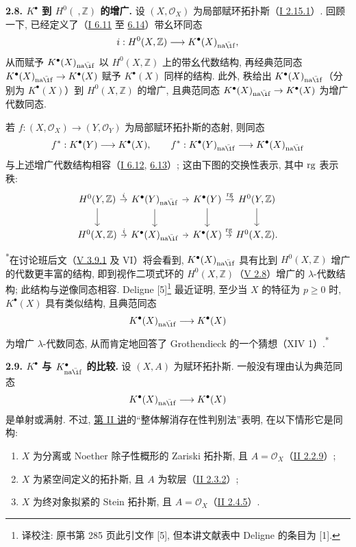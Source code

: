 \textbf{2.8. \(K^{\bullet}\) 到 \(H^0(\ ,\mathbb Z)\) 的增广.} 设 \((X,\mathcal O_X)\) 为局部赋环拓扑斯（\hyperlink{sga6.e01.lem.2-15-1}{I 2.15.1}）. 回顾一下, 已经定义了（\hyperlink{sga6.e01.def.6-11}{I 6.11} 至 \hyperlink{sga6.e01.prop.6-14}{6.14}）带幺环同态
\[
 i:H^0(X,\mathbb Z)\longrightarrow K^{\bullet}(X)_{\naif},
\]
从而赋予 \(K^{\bullet}(X)_{\naif}\) 以 \(H^0(X,\mathbb Z)\) 上的带幺代数结构, 再经典范同态 \(K^{\bullet}(X)_{\naif}\to K^{\bullet}(X)\) 赋予 \(K^{\bullet}(X)\) 同样的结构. 此外, 秩给出 \(K^{\bullet}(X)_{\naif}\)（分别为 \(K^{\bullet}(X)\)）到 \(H^0(X,\mathbb Z)\) 的增广, 且典范同态 \(K^{\bullet}(X)_{\naif}\to K^{\bullet}(X)\) 为增广代数同态.

若 \(f:(X,\mathcal O_X)\to(Y,\mathcal O_Y)\) 为局部赋环拓扑斯的态射, 则同态
\[
 f^*:K^{\bullet}(Y)\longrightarrow K^{\bullet}(X),\qquad
 f^*:K^{\bullet}(Y)_{\naif}\longrightarrow K^{\bullet}(X)_{\naif}
\]
与上述增广代数结构相容（\hyperlink{sga6.e01.prop.6-12}{I 6.12}, \hyperlink{sga6.e01.para.6-13}{6.13}）; 这由下图的交换性表示, 其中 \(\operatorname{rg}\) 表示秩:
\[
\begin{tikzcd}[column sep=tiny]
H^0(Y,\mathbb Z)\arrow[r,"i"]\arrow[d]
&K^{\bullet}(Y)_{\naif}\arrow[r]\arrow[d]
&K^{\bullet}(Y)\arrow[r,"\Rg"]\arrow[d]
&H^0(Y,\mathbb Z)\arrow[d]\\
H^0(X,\mathbb Z)\arrow[r,"i"]
&K^{\bullet}(X)_{\naif}\arrow[r]
&K^{\bullet}(X)\arrow[r,"\Rg"]
&H^0(X,\mathbb Z).
\end{tikzcd}
\]
\textsuperscript{*}在讨论班后文（\hyperlink{sga6.e05.ex.3-9-1}{V 3.9.1} 及 VI）将会看到, \(K^{\bullet}(X)_{\naif}\) 具有比到 \(H^0(X,\mathbb Z)\) 增广的代数更丰富的结构, 即到视作二项式环的 \(H^0(X,\mathbb Z)\)（\hyperlink{sga6.e05.ex.2-8}{V 2.8}）增广的 \(\lambda\)-代数结构; 此结构与逆像同态相容. Deligne [5]\footnote{译校注: 原书第 285 页此引文作 [5], 但本讲文献表中 Deligne 的条目为 [1].} 最近证明, 至少当 \(X\) 的特征为 \(p\geq0\) 时, \(K^{\bullet}(X)\) 具有类似结构, 且典范同态
\[
 K^{\bullet}(X)_{\naif}\longrightarrow K^{\bullet}(X)
\]
为增广 \(\lambda\)-代数同态, 从而肯定地回答了 Grothendieck 的一个猜想（XIV 1）.\textsuperscript{*}

\textbf{2.9. \(K^{\bullet}\) 与 \(K^{\bullet}_{\naif}\) 的比较.} 设 \((X,A)\) 为赋环拓扑斯. 一般没有理由认为典范同态
\[
 K^{\bullet}(X)_{\naif}\longrightarrow K^{\bullet}(X)
\]
是单射或满射. 不过, \hyperlink{sga6.e02.expose}{第 II 讲}的“整体解消存在性判别法”表明, 在以下情形它是同构:
\begin{enumerate}[label=(\roman*)]
\item \(X\) 为分离或 Noether 除子性概形的 Zariski 拓扑斯, 且 \(A=\mathcal O_X\)（\hyperlink{sga6.e02.prop.2-2-9}{II 2.2.9}）;
\item \(X\) 为紧空间定义的拓扑斯, 且 \(A\) 为软层（\hyperlink{sga6.e02.prop.2-3-2}{II 2.3.2}）;
\item \(X\) 为终对象拟紧的 Stein 拓扑斯, 且 \(A=\mathcal O_X\)（\hyperlink{sga6.e02.prop.2-4-5}{II 2.4.5}）.
\end{enumerate}

